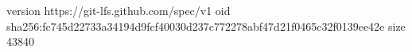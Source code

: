 version https://git-lfs.github.com/spec/v1
oid sha256:fc745d22733a34194d9fcf40030d237c772278abf47d21f0465c32f0139ee42e
size 43840
